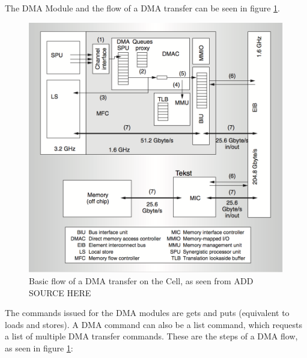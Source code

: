 The DMA Module and the flow of a DMA transfer can be seen in figure \ref{fig:CellDMA}.
\begin{figure}[h!]
    \centering
    \includegraphics[width=1\textwidth]{Figures/DMA/CellDMA}
    \caption{Basic flow of a DMA transfer on the Cell, as seen from ADD SOURCE HERE}
    \label{fig:CellDMA}
\end{figure}

The commands issued for the DMA modules are gets and puts (equivalent to loads and stores).
A DMA command can also be a list command, which requests a list of multiple DMA transfer commands.
These are the steps of a DMA flow, as seen in figure \ref{fig:CellDMA}:

